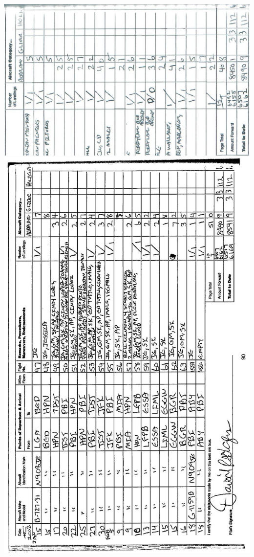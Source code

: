 \documentclass[10pt]{article}
\begin{document}
\includegraphics[max width=\textwidth, center]{2025_02_27_dd68c3d38de88f0516d9g-093}\\
\includegraphics[max width=\textwidth, center]{2025_02_27_dd68c3d38de88f0516d9g-094}\\
\end{document}
